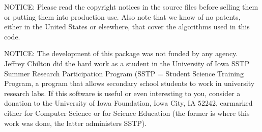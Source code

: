   NOTICE:  Please read the copyright notices in the source files before
	selling them or putting them into production use.  Also note that
	we know of no patents, either in the United States or elsewhere,
	that cover the algorithms used in this code.

  NOTICE:  The development of this package was not funded by any agency.
	Jeffrey Chilton did the hard work as a student in the University of
	Iowa SSTP Summer Research Participation Program (SSTP = Student Science
	Training Program, a program that allows secondary school students to
	work in university research labs.  If this software is useful or even
	interesting to you, consider a donation to the University of Iowa
	Foundation, Iowa City, IA 52242, earmarked either for Computer Science
	or for Science Education (the former is where this work was done, the
	latter administers SSTP).

